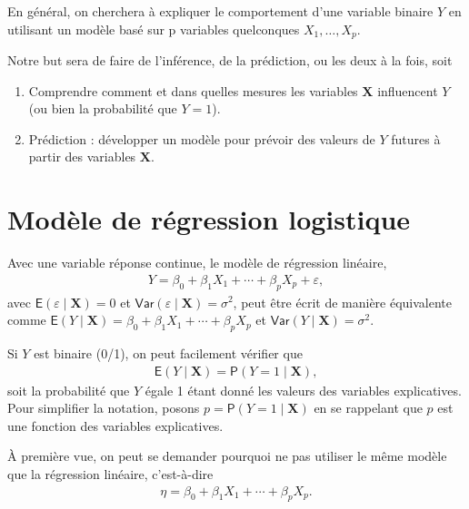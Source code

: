 \documentclass[
  11pt,
  letterpaper,
]{book}
\providecommand{\tightlist}{%
  \setlength{\itemsep}{0pt}\setlength{\parskip}{0pt}}
\theoremstyle{definition}
\theoremstyle{definition}
\theoremstyle{definition}
\theoremstyle{remark}
\begin{document}
En général, on cherchera à expliquer le comportement d'une variable binaire \(Y\) en utilisant un modèle basé sur p variables quelconques \(X_1, \ldots, X_p\).

Notre but sera de faire de l'inférence, de la prédiction, ou les deux à la fois, soit

\begin{enumerate}
\def\labelenumi{\arabic{enumi})}
\tightlist
\item
  Comprendre comment et dans quelles mesures les variables \(\boldsymbol{X}\) influencent \(Y\) (ou bien la probabilité que \(Y=1\)).
\item
  Prédiction : développer un modèle pour prévoir des valeurs de \(Y\) futures à partir des variables \(\boldsymbol{X}\).
\end{enumerate}

\hypertarget{moduxe8le-de-ruxe9gression-logistique}{%
\section{Modèle de régression logistique}\label{moduxe8le-de-ruxe9gression-logistique}}

Avec une variable réponse continue, le modèle de régression linéaire,
\begin{align*}
 Y = \beta_0 + \beta_1X_1 + \cdots + \beta_p X_p + \varepsilon,
\end{align*}
avec \({\mathsf E}\left(\varepsilon\mid \boldsymbol{X}\right)=0\) et \({\mathsf{Var}}\left(\varepsilon\mid \boldsymbol{X}\right)=\sigma^2\), peut être écrit de manière équivalente comme \({\mathsf E}\left(Y \mid \boldsymbol{X}\right) = \beta_0 + \beta_1X_1 + \cdots + \beta_pX_p\) et \({\mathsf{Var}}\left(Y \mid \boldsymbol{X}\right)=\sigma^2.\)

Si \(Y\) est binaire (0/1), on peut facilement vérifier que
\begin{align*}
{\mathsf E}\left(Y \mid \boldsymbol{X}\right) = {\mathsf P}\left(Y=1 \mid  \boldsymbol{X}\right),
\end{align*}
soit la probabilité que \(Y\) égale 1 étant donné les valeurs des variables explicatives. Pour simplifier la notation, posons \(p = {\mathsf P}\left(Y=1 \mid \boldsymbol{X}\right)\) en se rappelant que \(p\) est une fonction des variables explicatives.

À première vue, on peut se demander pourquoi ne pas utiliser le même modèle que la régression linéaire, c'est-à-dire
\begin{align*}
\eta=\beta_0 + \beta_1X_1 + \cdots + \beta_p X_p.
\end{align*}
\end{document}
